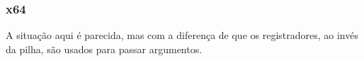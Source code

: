 \subsubsection{x64}

A situação aqui é parecida, mas com a diferença de que os registradores, ao invés da pilha, são usados para passar argumentos.






